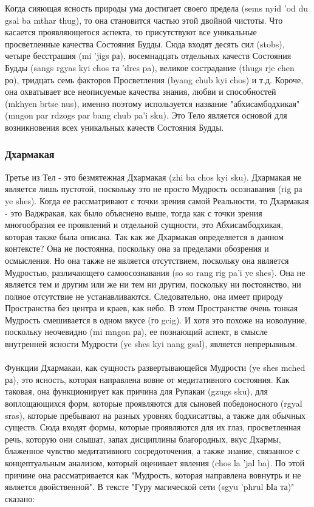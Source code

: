Когда сияющая ясность природы ума достигает своего предела (sems nyid 'od du gsal
ba mthar thug), то она становится частью этой двойной чистоты. Что касается
проявляющегося аспекта, то присутствуют все уникальные просветленные качества
Состояния Будды. Сюда входят десять сил (stobs), четыре бесстрашия (mi 'jigs ра),
восемнадцать отдельных качеств Состояния Будды (sangs rgyas kyi chos та 'dres pa), великое
сострадание (thugs rje chen ро), тридцать семь факторов Просветления (byang chub kyi chos) и
т.д. Короче, она охватывает все неописуемые качества знания, любви и способностей
(mkhyen brtse nus), именно поэтому используется название "абхисамбодхикая" (mngon par
rdzogs par bang chub pa'i sku). Это Тело является основой для возникновения всех
уникальных качеств Состояния Будды.

\subsubsection{Дхармакая}

Третье из Тел - это безмятежная Дхармакая (zhi ba chos kyi sku). Дхармакая не
является лишь пустотой, поскольку это не просто Мудрость осознавания (rig ра ye shes).
Когда ее рассматривают с точки зрения самой Реальности, то Дхармакая - это Ваджракая, как
было объяснено выше, тогда как с точки зрения многообразия ее проявлений и отдельной
сущности, это Абхисамбодхикая, которая также была описана. Так как же Дхармакая
определяется в данном контексте? Она не постоянна, поскольку она за пределами обозрения
и осмысления. Но она также не является отсутствием, поскольку она является Мудростью,
различающего самоосознавания (so so rang rig pa'i ye shes). Она не является тем и другим или
же ни тем ни другим, поскольку ни постоянство, ни полное отсутствие не устанавливаются.
Следовательно, она имеет природу Пространства без центра и краев, как небо. В этом
Пространстве очень тонкая Мудрость смешивается в одном вкусе (го gcig). И хотя это
похоже на новолуние, поскольку неочевидно (mi mngon ра), ее познающий аспект, в смысле
внутренней ясности Мудрости (ye shes kyi nang gsal), является непрерывным.\\
\\
Функции Дхармакаи, как сущность развертывающейся Мудрости (ye shes mched ра),
это ясность, которая направлена вовне от медитативного состояния. Как таковая, она
функционирует как причина для Рупакаи (gzugs sku), для воплощающихся форм, которые
проявляются для сыновей победоносного (rgyal sras), которые пребывают на разных уровнях
бодхисаттвы, а также для обычных существ. Сюда входят формы, которые проявляются для
их глаз, просветленная речь, которую они слышат, запах дисциплины благородных, вкус
Дхармы, блаженное чувство медитативного сосредоточения, а также знание, связанное с
концептуальным анализом, который оценивает явления (chos la 'jal ba). По этой причине она
рассматривается как "Мудрость, которая направлена вовнутрь и не является двойственной".
В тексте "Гуру магической сети (sgyu 'phrul Ыа та)" сказано:\\

